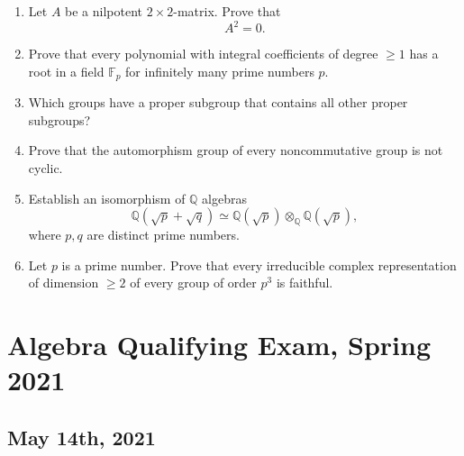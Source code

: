 \documentclass{article}
\begin{document}
\begin{enumerate}
    \item Let \(A\) be a nilpotent \(2 \times 2\)-matrix. Prove that 
    \[A^2 = 0.\]

    \item Prove that every polynomial with integral coefficients of degree \(\geq 1\) has a root in a field \(\mathbb{F}_p\) for infinitely many prime numbers \(p\).

    \item Which groups have a proper subgroup that contains all other proper subgroups?

    \item Prove that the automorphism group of every noncommutative group is not cyclic.

    \item Establish an isomorphism of \(\mathbb{Q}\) algebras 
    \[\mathbb{Q}(\sqrt{p} + \sqrt{q}) \simeq \mathbb{Q}(\sqrt{p}) \otimes_{\mathbb{Q}} \mathbb{Q}(\sqrt{p}),\] 
    where \(p, q\) are distinct prime numbers.

    \item Let \(p\) is a prime number. Prove that every irreducible complex representation of dimension \(\geq 2\) of every group of order \(p^3\) is faithful.
\end{enumerate}

\section*{Algebra Qualifying Exam, Spring 2021}
\subsection*{May 14th, 2021}
\end{document}
